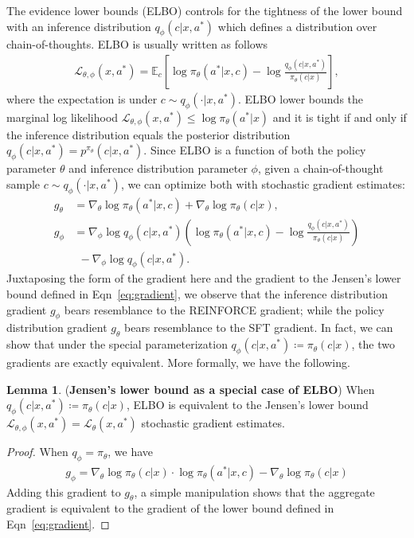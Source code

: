 \documentclass{article}
\theoremstyle{definition}
\newtheorem{lemma}[theorem]{Lemma}
\begin{document}
The evidence lower bounds (ELBO) \citep{blei2006variational,kingma2013,burda2015importance} controls for the tightness of the lower bound with an inference distribution $q_\phi(c|x,a^\ast)$ which defines a distribution over chain-of-thoughts. ELBO is usually written as follows
\begin{align}
    \mathcal{L}_{\theta,\phi}(x,a^\ast) = \mathbb{E}_{c}\left[\log \pi_\theta(a^\ast|x,c) - \log \frac{q_\phi(c|x,a^*)}{\pi_\theta(c|x)}\right],\label{eq:eval}
\end{align}
where the expectation is under $c\sim q_\phi(\cdot|x,a^\ast)$.
ELBO lower bounds the marginal log likelihood $\mathcal{L}_{\theta,\phi}(x,a^\ast)\leq \log \pi_\theta(a^\ast|x)$ and it is tight if and only if the inference distribution equals the posterior distribution $q_\phi(c|x,a^\ast)=p^{\pi_\theta}(c|x,a^\ast)$. Since ELBO is a function of both the policy parameter $\theta$ and inference distribution parameter $\phi$, given a chain-of-thought sample $c\sim q_\phi(\cdot|x,a^\ast)$, we can optimize both with stochastic gradient estimates:
\begin{align*}
    g_\theta &= \nabla_\theta \log \pi_\theta(a^\ast|x,c) + \nabla_\theta \log \pi_\theta(c|x),\\
    g_\phi &= \nabla_\phi \log q_\phi(c|x,a^\ast)\left(\log \pi_\theta(a^\ast|x,c) -\log \frac{q_\phi(c|x,a^*)}{\pi_\theta(c|x)}\right) \\
    &\ \ -\nabla_\phi \log q_\phi(c|x,a^*).
\end{align*}
Juxtaposing the form of the gradient here and the gradient to the Jensen's lower bound defined in Eqn~\eqref{eq:gradient}, we observe that the inference distribution gradient $g_\phi$ bears resemblance to the REINFORCE gradient; while the policy distribution gradient $g_\theta$ bears resemblance to the SFT gradient. In fact, we can show that under the special parameterization $q_\phi(c|x,a^\ast)\coloneqq\pi_\theta(c|x)$, the two gradients are exactly equivalent. More formally, we have the following.

\begin{lemma} (\textbf{Jensen's lower bound as a special case of ELBO}) \label{lemma:elbo-special-case}
    When $q_\phi(c|x,a^\ast)\coloneqq\pi_\theta(c|x)$, ELBO is equivalent to the Jensen's lower bound $\mathcal{L}_{\theta,\phi}(x,a^\ast)=\mathcal{L}_{\theta}(x,a^\ast)$ stochastic gradient estimates.
\end{lemma}
\begin{proof}
    When $q_\phi=\pi_\theta$, we have
    \begin{align*}
        g_\phi = \nabla_\theta \log \pi_\theta(c|x)\cdot \log \pi_\theta(a^\ast|x,c) - \nabla_\theta \log \pi_\theta(c|x)
    \end{align*}
    Adding this gradient to $g_\theta$, a simple manipulation shows that the aggregate gradient is equivalent to the gradient of the lower bound defined in Eqn~\eqref{eq:gradient}.
\end{proof}
\end{document}
